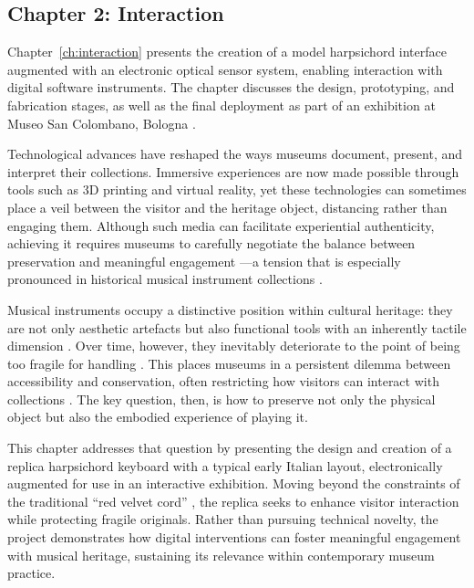 \subsection{Chapter 2: Interaction}

Chapter~\ref{ch:interaction} presents the creation of a model harpsichord
interface augmented with an electronic optical sensor system, enabling
interaction with digital software instruments. The chapter discusses the design,
prototyping, and fabrication stages, as well as the final deployment as part of
an exhibition at Museo San Colombano, Bologna \cite{san_colombano_2025}.

Technological advances have reshaped the ways museums document, present, and
interpret their collections. Immersive experiences are now made possible through
tools such as 3D printing and virtual reality, yet these technologies can
sometimes place a veil between the visitor and the heritage object, distancing
rather than engaging them. Although such media can facilitate experiential
authenticity, achieving it requires museums to carefully negotiate the balance
between preservation and meaningful engagement \cite{pine_museums_2007}---a
tension that is especially pronounced in historical musical instrument
collections \cite{mcalpine_sampling_2014}.

Musical instruments occupy a distinctive position within cultural heritage: they
are not only aesthetic artefacts but also functional tools with an inherently
tactile dimension \cite{charalampos_role_2018}. Over time, however, they
inevitably deteriorate to the point of being too fragile for handling
\cite{paradiso_to-save_2019}. This places museums in a persistent dilemma
between accessibility and conservation, often restricting how visitors can
interact with collections \cite{templeton_museum_2018, mcalpine_sampling_2014}.
The key question, then, is how to preserve not only the physical object but also
the embodied experience of playing it.

This chapter addresses that question by presenting the design and creation of a
replica harpsichord keyboard with a typical early Italian layout, electronically
augmented for use in an interactive exhibition. Moving beyond the constraints of
the traditional ``red velvet cord'' \cite{mcalpine_sampling_2014,
masu_o-in-nime_2023}, the replica seeks to enhance visitor interaction while
protecting fragile originals. Rather than pursuing technical novelty, the
project demonstrates how digital interventions can foster meaningful engagement
with musical heritage, sustaining its relevance within contemporary museum
practice.

